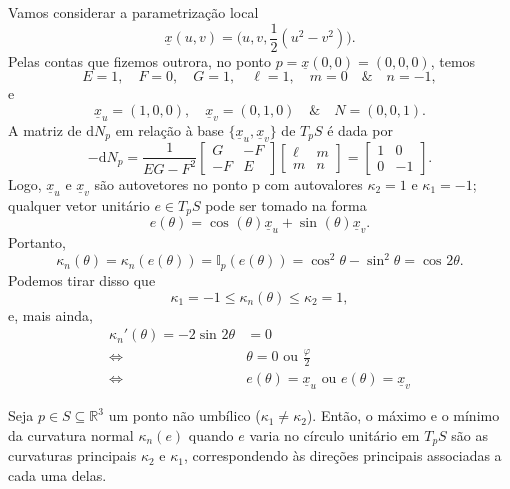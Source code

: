 \documentclass[../differential_geometry.tex]{subfiles}
\begin{document}
\begin{example}
	Vamos considerar a parametrização local
	\[
		\underline{x}(u, v) = \biggl(u, v, \frac{1}{2}(u^{2}-v^{2})\biggr).
	\]
	Pelas contas que fizemos outrora, no ponto \(p = \underline{x}(0, 0) = (0, 0, 0)\), temos
	\[
		E = 1, \quad F = 0, \quad G = 1, \quad \ell =1, \quad m=0 \quad\&\quad n = -1,
	\]
	e
	\[
		\underline{x}_{u}=(1, 0, 0), \quad \underline{x}_{v} = (0, 1, 0) \quad\&\quad  N = (0, 0, 1).
	\]
	A matriz de \(\mathrm{d}N_{p}\) em relação à base \(\{\underline{x}_{u}, \underline{x}_{v}\}\) de \(T_{p}S\) é dada por
	\[
		-\mathrm{d}N_{p} = \frac{1}{EG - F^{2}}\begin{bmatrix}
			G  & -F \\
			-F & E
		\end{bmatrix} \begin{bmatrix}
			\ell & m \\
			m    & n
		\end{bmatrix} = \begin{bmatrix}
			1 & 0  \\
			0 & -1
		\end{bmatrix}.
	\]
	Logo, \(\underline{x}_{u}\) e \(\underline{x}_{v}\) são autovetores no ponto p com autovalores \(\kappa_{2} = 1\) e \(\kappa_{1}=-1\); qualquer vetor unitário \(e\in T_{p}S\) pode ser tomado na forma
	\[
		e(\theta ) = \cos^{}{(\theta)}\underline{x}_{u} + \sin^{}{(\theta)}\underline{x}_{v}.
	\]
	Portanto,
	\[
		\kappa_{n}(\theta ) = \kappa_{n}(e(\theta )) = \mathbb{I}_{p}(e(\theta ))=\cos^{2}{\theta }-\sin^{2}{\theta } = \cos^{}{2\theta }.
	\]
	Podemos tirar disso que
	\[
		\kappa_{1}=-1 \leq \kappa_{n}(\theta ) \leq \kappa_{2}=1,
	\]
	e, mais ainda,
	\begin{align*}
		\kappa_{n}'(\theta ) = -2\sin^{}{2\theta } & =0                                                                      \\
		\Longleftrightarrow                        & \theta  = 0 \text{ ou }\frac{\varphi }{2}                               \\
		\Longleftrightarrow                        & e(\theta ) = \underline{x}_{u} \text{ ou } e(\theta )=\underline{x}_{v}
	\end{align*}
\end{example}
\begin{prop*}
	Seja \(p\in S\subseteq \mathbb{R}^{3}\) um ponto não umbílico (\(\kappa_1\neq \kappa_2\)). Então, o máximo e o mínimo da curvatura normal \(\kappa_{n}(e)\) quando \(e\) varia no círculo unitário em \(T_{p}S\) são as curvaturas principais \(\kappa_2\) e \(\kappa_1\), correspondendo às direções principais associadas a cada uma delas.
\end{prop*}
\end{document}
